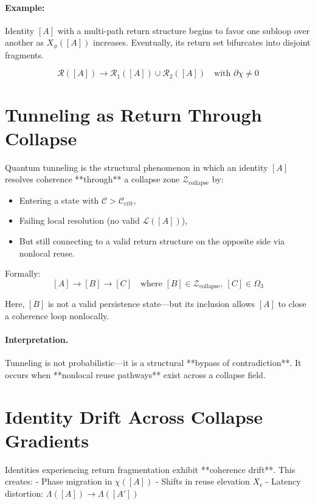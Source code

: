 \paragraph{Example:} Identity $[A]$ with a multi-path return structure begins to favor one subloop over another as $X_\phi([A])$ increases. Eventually, its return set bifurcates into disjoint fragments.

\[
\mathcal{R}([A]) \to \mathcal{R}_1([A]) \cup \mathcal{R}_2([A]) \quad \text{with } \partial \chi \ne 0
\]

\section{Tunneling as Return Through Collapse}

\begin{definition}
Quantum tunneling is the structural phenomenon in which an identity $[A]$ resolves coherence **through** a collapse zone $\mathcal{Z}_{\text{collapse}}$ by:
\begin{itemize}
  \item Entering a state with $\mathcal{C} > \mathcal{C}_{\text{crit}}$,
  \item Failing local resolution (no valid $\mathcal{L}([A])$),
  \item But still connecting to a valid return structure on the opposite side via nonlocal reuse.
\end{itemize}
\end{definition}

Formally:
\[
[A] \to [B] \to [C] \quad \text{where } [B] \in \mathcal{Z}_{\text{collapse}},\ [C] \in \Omega_3
\]

Here, $[B]$ is not a valid persistence state—but its inclusion allows $[A]$ to close a coherence loop nonlocally.

\paragraph{Interpretation.}
Tunneling is not probabilistic—it is a structural **bypass of contradiction**. It occurs when **nonlocal reuse pathways** exist across a collapse field.

\section{Identity Drift Across Collapse Gradients}

Identities experiencing return fragmentation exhibit **coherence drift**. This creates:
- Phase migration in $\chi([A])$
- Shifts in reuse elevation $X_\epsilon$
- Latency distortion: $\Lambda([A]) \to \Lambda([A'])$

